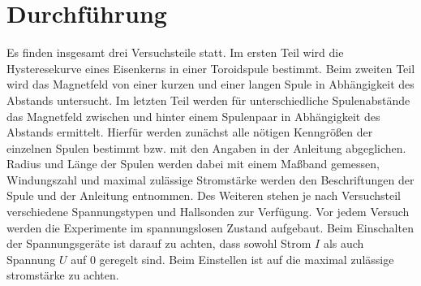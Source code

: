 \section{Durchführung}
Es finden insgesamt drei Versuchsteile statt. 
Im ersten Teil wird die Hysteresekurve eines Eisenkerns in einer Toroidspule bestimmt.
Beim zweiten Teil wird das Magnetfeld von einer kurzen und einer langen Spule in Abhängigkeit des Abstands untersucht.
Im letzten Teil werden für unterschiedliche Spulenabstände das Magnetfeld zwischen und hinter einem Spulenpaar in Abhängigkeit des Abstands ermittelt.
Hierfür werden zunächst alle nötigen Kenngrößen der einzelnen Spulen bestimmt bzw. mit den Angaben in der Anleitung \cite[]{man:v308} abgeglichen.
Radius und Länge der Spulen werden dabei mit einem Maßband gemessen,
Windungszahl und maximal zulässige Stromstärke werden den Beschriftungen der Spule und der Anleitung entnommen.
Des Weiteren stehen je nach Versuchsteil verschiedene Spannungstypen und Hallsonden zur Verfügung.
Vor jedem Versuch werden die Experimente im spannungslosen Zustand aufgebaut.
Beim Einschalten der Spannungsgeräte ist darauf zu achten, dass sowohl Strom $I$ als auch Spannung $U$ auf 0 geregelt sind.
Beim Einstellen ist auf die maximal zulässige stromstärke zu achten.






